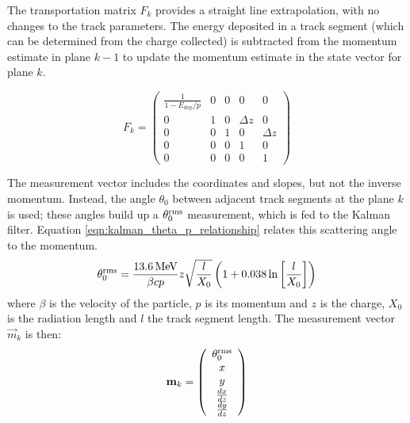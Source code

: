 The transportation matrix $F_k$ provides a straight line extrapolation, with no changes to the track parameters. The energy deposited in a track segment (which can be determined from the charge collected) is subtracted from the momentum estimate in plane $k-1$ to update the momentum estimate in the state vector for plane $k$.

\begin{equation}\label{eqn:kalman_transportation_matrix}
    F_k = \left( \begin{array}{ccccc}
    \frac{1}{1-E_{\mathrm{dep}}/p}  &   0   &   0   &   0       &   0       \\
    0                               &   1   &   0   & \Delta z  &   0       \\
    0                               &   0   &   1   &   0       & \Delta z  \\
    0                               &   0   &   0   &   1       &   0       \\
    0                               &   0   &   0   &   0       &   1
    \end{array} \right)
\end{equation}

The measurement vector includes the coordinates and slopes, but not the inverse momentum. Instead, the angle $\theta_0$ between adjacent track segments at the plane $k$ is used; these angles build up a $\theta_0^{\mathrm{rms}}$ measurement, which is fed to the Kalman filter. Equation \eqref{eqn:kalman_theta_p_relationship} relates this scattering angle to the momentum\citep{Eidelman2004}.
\begin{equation}\label{eqn:kalman_theta_p_relationship}
    \theta_0^{\mathrm{rms}} = \frac{13.6\,\mathrm{MeV}}{\beta c p} z \sqrt{\frac{l}{X_0}} \left(1 + 0.038\ln\left[\frac{l}{X_0}\right]\right)
\end{equation}
where $\beta$ is the velocity of the particle, $p$ is its momentum and $z$ is the charge, $X_0$ is the radiation length and $l$ the track segment length. The measurement vector $\vec{m}_k$ is then:
\begin{equation}\label{eqn:kalman_measurement_vector}
    \mathbf{m}_k = \left( \begin{array}{c} \theta_0^{\mathrm{rms}} \\ x \\ y \\ \frac{dx}{dz} \\ \frac{dy}{dz} \end{array} \right)
\end{equation}

